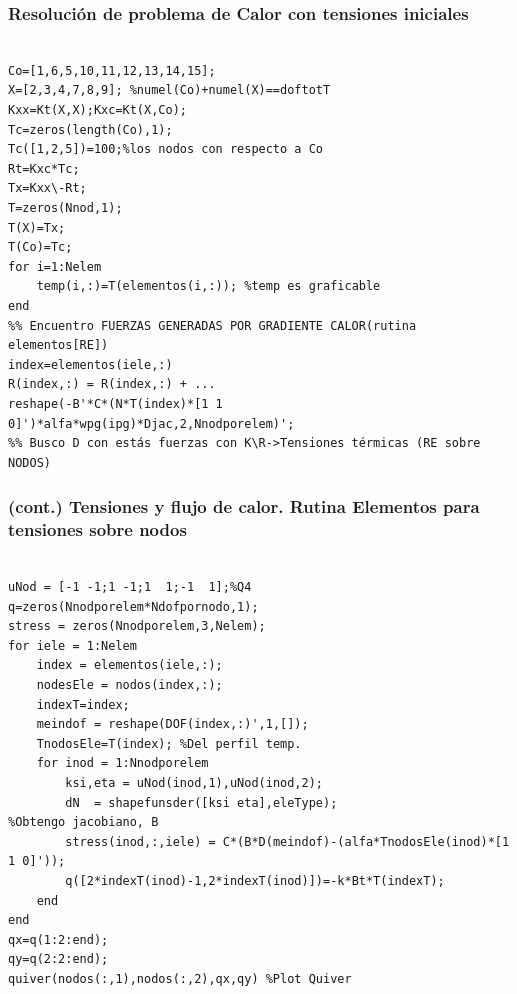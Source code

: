 \subsubsection*{Resolución de problema de Calor con tensiones iniciales}
\begin{code}\label{cod:calorDesconocidos}
\begin{verbatim}

Co=[1,6,5,10,11,12,13,14,15];
X=[2,3,4,7,8,9]; %numel(Co)+numel(X)==doftotT
Kxx=Kt(X,X);Kxc=Kt(X,Co);
Tc=zeros(length(Co),1);
Tc([1,2,5])=100;%los nodos con respecto a Co
Rt=Kxc*Tc;
Tx=Kxx\-Rt;
T=zeros(Nnod,1);
T(X)=Tx;
T(Co)=Tc;
for i=1:Nelem
    temp(i,:)=T(elementos(i,:)); %temp es graficable
end
%% Encuentro FUERZAS GENERADAS POR GRADIENTE CALOR(rutina elementos[RE])
index=elementos(iele,:)
R(index,:) = R(index,:) + ...
reshape(-B'*C*(N*T(index)*[1 1 0]')*alfa*wpg(ipg)*Djac,2,Nnodporelem)';
%% Busco D con estás fuerzas con K\R->Tensiones térmicas (RE sobre NODOS)
\end{verbatim}
\end{code}

\subsubsection*{(cont.) Tensiones y flujo de calor. Rutina Elementos para tensiones sobre nodos}
\begin{code}
\begin{verbatim}

uNod = [-1 -1;1 -1;1  1;-1  1];%Q4
q=zeros(Nnodporelem*Ndofpornodo,1);
stress = zeros(Nnodporelem,3,Nelem);
for iele = 1:Nelem
    index = elementos(iele,:);
    nodesEle = nodos(index,:);
    indexT=index;
    meindof = reshape(DOF(index,:)',1,[]);
    TnodosEle=T(index); %Del perfil temp.
    for inod = 1:Nnodporelem
        ksi,eta = uNod(inod,1),uNod(inod,2);
        dN  = shapefunsder([ksi eta],eleType);
%Obtengo jacobiano, B
        stress(inod,:,iele) = C*(B*D(meindof)-(alfa*TnodosEle(inod)*[1 1 0]'));
        q([2*indexT(inod)-1,2*indexT(inod)])=-k*Bt*T(indexT);
    end
end
qx=q(1:2:end);
qy=q(2:2:end);
quiver(nodos(:,1),nodos(:,2),qx,qy) %Plot Quiver
\end{verbatim}
\end{code}

